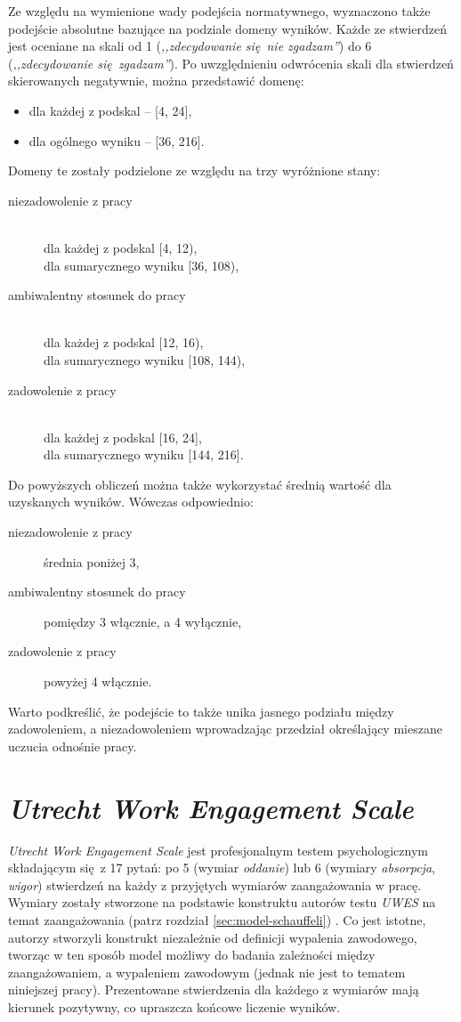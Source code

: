 Ze względu na wymienione wady podejścia normatywnego, wyznaczono także podejście absolutne bazujące na podziale domeny wyników. Każde ze stwierdzeń jest oceniane na skali od 1 (\textit{,,zdecydowanie się nie zgadzam''}) do 6 (\textit{,,zdecydowanie się zgadzam''}). Po uwzględnieniu odwrócenia skali dla stwierdzeń skierowanych negatywnie, można przedstawić domenę:
\begin{itemize}
\item dla każdej z podskal -- [4, 24],
\item dla ogólnego wyniku -- [36, 216].
\end{itemize}
Domeny te zostały podzielone ze względu na trzy wyróżnione stany:
\begin{description}
\item[niezadowolenie z pracy] \hfill \\
dla każdej z podskal [4, 12), \hfill \\ dla sumarycznego wyniku [36, 108),
\item[ambiwalentny stosunek do pracy] \hfill \\
dla każdej z podskal [12, 16), \hfill \\ dla sumarycznego wyniku [108, 144),
\item[zadowolenie z pracy] \hfill \\
dla każdej z podskal [16, 24], \hfill \\ dla sumarycznego wyniku [144, 216].
\end{description}

Do powyższych obliczeń można także wykorzystać średnią wartość dla uzyskanych wyników. Wówczas odpowiednio:
\begin{description}
\item[niezadowolenie z pracy] średnia poniżej 3,
\item[ambiwalentny stosunek do pracy] pomiędzy 3 włącznie, a 4 wyłącznie,
\item[zadowolenie z pracy] powyżej 4 włącznie.
\end{description}

Warto podkreślić, że podejście to także unika jasnego podziału między zadowoleniem, a niezadowoleniem wprowadzając przedział określający mieszane uczucia odnośnie pracy.

\section{\emph{Utrecht Work Engagement Scale}}
\label{sec:tests-eng}
\emph{Utrecht Work Engagement Scale} jest profesjonalnym testem psychologicznym składającym się z 17 pytań: po 5 (wymiar \textit{oddanie}) lub 6 (wymiary \textit{absorpcja}, \textit{wigor}) stwierdzeń na każdy z przyjętych wymiarów zaangażowania w pracę. Wymiary zostały stworzone na podstawie konstruktu autorów testu \emph{UWES} na temat zaangażowania (patrz rozdział \ref{sec:model-schauffeli}) \cite{schaufeli2001burnout}. Co jest istotne, autorzy stworzyli konstrukt niezależnie od definicji wypalenia zawodowego, tworząc w ten sposób model możliwy do
badania zależności między zaangażowaniem, a wypaleniem zawodowym (jednak nie jest to tematem niniejszej pracy). Prezentowane stwierdzenia dla każdego z wymiarów mają kierunek pozytywny, co upraszcza końcowe liczenie wyników.

